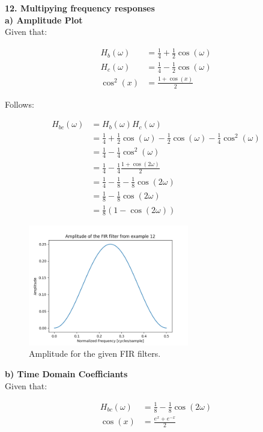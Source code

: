 \newpage
\textbf{\large 12. Multipying frequency responses}
\\

\textbf{a) Amplitude Plot}\\

Given that:

\begin{align}
	H_b(\omega) &= \frac{1}{4} + \frac{1}{2} \cos(\omega) \\
	H_c(\omega) &= \frac{1}{4} - \frac{1}{2} \cos(\omega) \\
	\cos^2(x) &= \frac{1+\cos(x)}{2}
\end{align}

Follows:

\begin{align*}
	H_{bc}(\omega) &= H_b(\omega) H_c(\omega) \\
	&= \frac{1}{4} + \frac{1}{2} \cos(\omega) - \frac{1}{2} \cos(\omega) - \frac{1}{4} \cos^2(\omega)\\
	&= \frac{1}{4} - \frac{1}{4} \cos^2(\omega) \\
	&= \frac{1}{4} - \frac{1}{4} \frac{1+\cos(2\omega)}{2} \\
	&= \frac{1}{4} - \frac{1}{8} - \frac{1}{8}\cos(2\omega) \\
	&= \frac{1}{8} - \frac{1}{8} \cos(2\omega) \\
	&= \frac{1}{8} \left(1 - \cos(2\omega)\right)
\end{align*}

\begin{figure}[h]
	\centering
	\includegraphics[width=7cm]{img/ex_12.png}
	\captionsetup{width=5cm}
	\caption{Amplitude for the given FIR filters.}
\end{figure}

\newpage

\textbf{b) Time Domain Coefficiants} \\

Given that:

\begin{align}
	H_{bc}(\omega) &= \frac{1}{8} - \frac{1}{8} \cos(2\omega) \\
	\cos(x) &= \frac{e^x + e^{-x}}{2}
\end{align}


